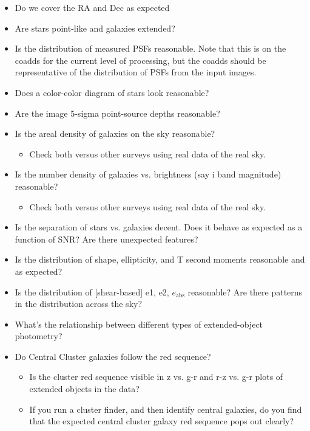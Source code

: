\documentclass[11pt]{report}
\begin{document}
\begin{itemize}
  \item Do we cover the RA and Dec as expected
  \item Are stars point-like and galaxies extended?
  \item Is the distribution of measured PSFs reasonable.  Note that this is on the coadds for the current level of processing, but the coadds should be representative of the distribution of PSFs from the input images.
  \item Does a color-color diagram of stars look reasonable?
  \item Are the image 5-sigma point-source depths reasonable?
  \item Is the areal density of galaxies on the sky reasonable?
      \begin{itemize}
          \item Check both versus other surveys using real data of the real sky. 
      \end{itemize}
  \item Is the number density of galaxies vs. brightness (say i band magnitude) reasonable?
      \begin{itemize}
          \item Check both versus other surveys using real data of the real sky. 
      \end{itemize}
  \item Is the separation of stars vs. galaxies decent.  Does it behave as expected as a function of SNR?  Are there unexpected features?
  \item Is the distribution of shape, ellipticity, and T second moments reasonable and as expected?
  \item Is the distribution of [shear-based] e1, e2, $e_\text{abs}$ reasonable?  Are there patterns in the distribution across the sky?
  \item What's the relationship between different types of extended-object photometry?
  \item Do Central Cluster galaxies follow the red sequence?
  \begin{itemize}
      \item Is the cluster red sequence visible in z vs. g-r and r-z vs. g-r plots of extended objects in the data?
      \item If you run a cluster finder, and then identify central galaxies, do you find that the expected central cluster galaxy red sequence pops out clearly?
  \end{itemize}

\end{itemize}
\end{document}
